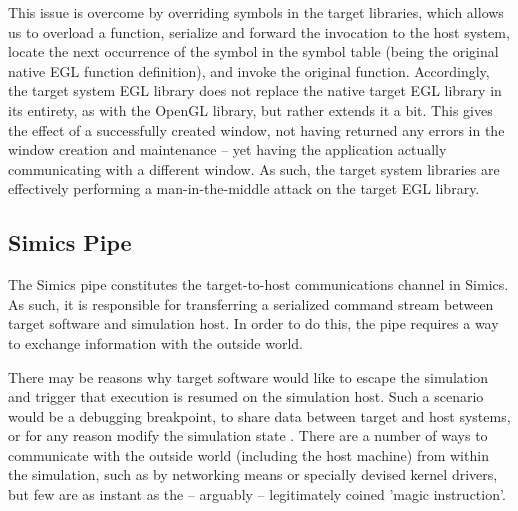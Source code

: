 This issue is overcome by overriding symbols in the target libraries, which allows us to overload a function, serialize and forward the invocation to the host system, locate the next occurrence of the symbol in the symbol table (being the original native EGL function definition), and invoke the original function.
Accordingly, the target system EGL library does not replace the native target EGL library in its entirety, as with the OpenGL library, but rather extends it a bit.
This gives the effect of a successfully created window, not having returned any errors in the window creation and maintenance -- yet having the application actually communicating with a different window.
As such, the target system libraries are effectively performing a man-in-the-middle attack on the target EGL library.

\subsection{Simics Pipe}
\label{sec:proposedsolutionandimplementation_simicspipe}
The Simics pipe constitutes the target-to-host communications channel in Simics.
As such, it is responsible for transferring a serialized command stream between target software and simulation host.
In order to do this, the pipe requires a way to exchange information with the outside world.

There may be reasons why target software would like to escape the simulation and trigger that execution is resumed on the simulation host.
Such a scenario would be a debugging breakpoint, to share data between target and host systems, or for any reason modify the simulation state .
There are a number of ways to communicate with the outside world (including the host machine) from within the simulation, such as by networking means or specially devised kernel drivers, but few are as instant as the -- arguably -- legitimately coined 'magic instruction'.

